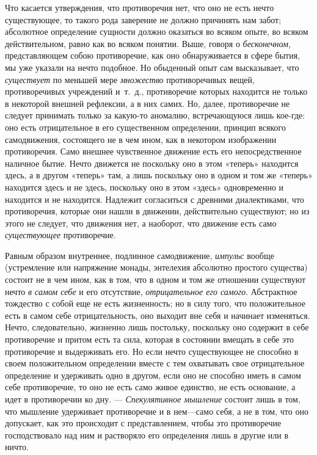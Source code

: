 Что касается утверждения, что противоречия нет, что оно не есть нечто
существующее, то такого рода заверение не должно причинять нам забот;
абсолютное определение сущности должно оказаться во всяком опыте, во всяком
действительном, равно как во всяком понятии. Выше, говоря о
{\em бесконечном}, представляющем собою противоречие,
как оно обнаруживается в сфере бытия, мы уже указали на нечто подобное. Но
обыденный опыт сам высказывает, что {\em существует} по
меньшей мере {\em множество} противоречивых вещей,
противоречивых учреждений и~т.~д., противоречие которых находится не только
в некоторой внешней рефлексии, а в них самих. Но, далее, противоречие не
следует принимать только за какую-то аномалию, встречающуюся лишь кое-где:
оно есть отрицательное в его существенном определении, принцип всякого
самодвижения, состоящего не в чем ином, как в некотором изображении
противоречия. Само внешнее чувственное движение есть его непосредственное
наличное бытие. Нечто движется не поскольку оно в этом «теперь» находится
здесь, а в другом «теперь» там, а лишь поскольку оно в одном и том же
«теперь» находится здесь и не здесь, поскольку оно в этом «здесь»
одновременно и находится и не находится. Надлежит согласиться с древними
диалектиками, что противоречия, которые они нашли в движении, действительно
существуют; но из этого не следует, что движения нет, а наоборот, что
движение есть само {\em существующее} противоречие.

Равным образом внутреннее, подлинное самодвижение,
{\em импульс} вообще (устремление или напряжение
монады, энтелехия абсолютно простого существа) состоит не в чем ином, как в
том, что в одном и том же отношении существуют нечто
{\em в самом себе} и его отсутствие,
{\em отрицательное его самого}. Абстрактное тождество с
собой еще не есть жизненность; но в силу того, что положительное есть в
самом себе отрицательность, оно выходит вне себя и начинает изменяться.
Нечто, следовательно, жизненно лишь постольку, поскольку оно содержит в
себе противоречие и притом есть та сила, которая в состоянии вмещать в себе
это противоречие и выдерживать его. Но если нечто существующее не способно
в своем положительном определении вместе с тем охватывать свое
отрицательное определение и удерживать одно в другом, если оно не способно
иметь в самом себе противоречие, то оно не есть само живое единство, не
есть основание, а идет в противоречии ко дну. —
{\em Спекулятивное мышление} состоит лишь в том, что
мышление удерживает противоречие и в нем—само себя, а не в том, что оно
допускает, как это происходит с представлением, чтобы это противоречие
господствовало над ним и растворяло его определения лишь в другие или в
ничто.

